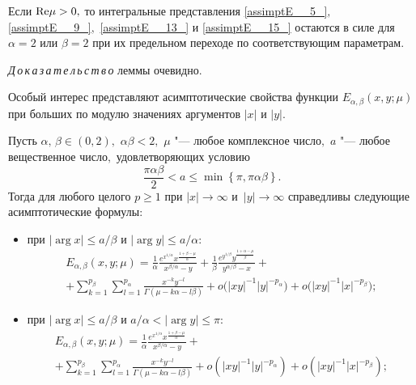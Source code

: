 {\smallskip

\begin{lemma}[4] Если ${\rm Re}\mu >0,$ то интегральные представления \eqref{assimptE__5_}$,$
\eqref{assimptE__9_}$,$ \eqref{assimptE__13_} и \eqref{assimptE__15_} остаются
в силе для $\alpha =2$ или $\beta =2$ при их предельном переходе по соответствующим
параметрам$.$
\end{lemma}

{\it Д\,о\,к\,а\,з\,а\,т\,е\,л\,ь\,с\,т\,в\,о} леммы очевидно.

\smallskip

Особый интерес представляют асимптотические свойства функции
$E_{\alpha, \beta }  (x, y; \mu)$ при больших по модулю значениях
аргументов $|x|$ и $|y|$.

\smallskip

\begin{theorem}
Пусть $\alpha,\,\beta \in (0, 2),$ $\alpha \beta <2,$ $\mu$ "--- любое комплексное число$,$ $a$ "--- любое вещественное число$,$ удовлетворяющих условию
\begin{equation*}
\frac{\pi \alpha \beta }{2} <a\le \min \left\{\pi ,\pi \alpha \beta \right\}.
\end{equation*}
Тогда для любого целого $p\ge 1$ при $|x|\to \infty $ и~$|y|\to \infty $ справедливы следующие асимптотические формулы{\rm:}


\begin{itemize}
\item[\rm1)] при $|\arg x|\le a/\beta  $ и
$\left|\arg y\right|\le a/\alpha {:}$
\begin{multline}
\label{assimptE__19_}
E_{\alpha, \beta }  (x, y; \mu)=\frac{1}{\alpha } \frac{e^{x^{1/ \alpha}  } x^{\frac{1+\beta -\mu }{\alpha } } }{x^{\beta /\alpha} -y} +\frac{1}{\beta } \frac{e^{y^{1/\beta} } y^{\frac{1+\alpha -\mu }{\beta } } }{y^{\alpha/\beta}  -x} +
\\
+\sum _{k=1}^{p_{\beta } }\sum _{l=1}^{p_{\alpha } }\frac{x^{-k} y^{-l} }{\Gamma (\mu -k\alpha -l\beta)} + o\bigl(|xy|^{-1}|y|^{-p_\alpha}\bigr) + o\bigl(|xy|^{-1}|x|^{-p_\beta}\bigr);
\end{multline}


\item[\rm2)] при $|\arg x|\le a/\beta $ и $a/\alpha  <\left|\arg y\right|\le \pi {:}$
\begin{multline}
\label{assimptE__20_}
E_{\alpha, \beta }  (x, y; \mu)=\frac{1}{\alpha } \frac{e^{x^{1/ \alpha}  } x^{\frac{1+\beta -\mu }{\alpha } } }{x^{\beta /\alpha} -y}+
\\
+\sum _{k=1}^{p_{\beta } }\sum _{l=1}^{p_{\alpha } }\frac{x^{-k} y^{-l} }{\Gamma (\mu -k\alpha -l\beta)} + o\left(|xy|^{-1}|y|^{-p_\alpha}\right) + o\left(|xy|^{-1}|x|^{-p_\beta}\right);
\end{multline}
%


\end{itemize}
\end{theorem}}
